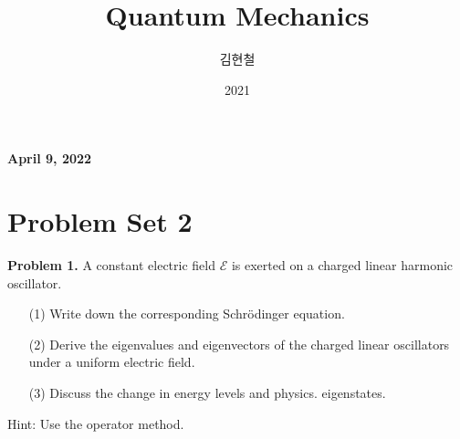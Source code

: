 \documentclass[floatfix,nofootinbib,superscriptaddress,fleqn]{revtex4-2}
\begin{document}
\title{\Large Quantum Mechanics}
\author{김현철}
\date{2021}

\maketitle

 \textbf{\color{red} April 9, 2022} \\ 
\vspace{2cm}

\section*{\large Problem Set 2}
\noindent \textbf{Problem 1.}
A constant electric field $\mathcal{E}$ is exerted on a charged linear
harmonic oscillator. 
\begin{itemize}
\item[(1)] Write down the corresponding Schr\"odinger equation. 
\item[(2)] Derive the eigenvalues and eigenvectors of the charged
  linear oscillators under a uniform electric field. 
\item[(3)] Discuss the change in energy levels and physics. 
  eigenstates. 
\end{itemize}
Hint: Use the operator method.
\end{document}
